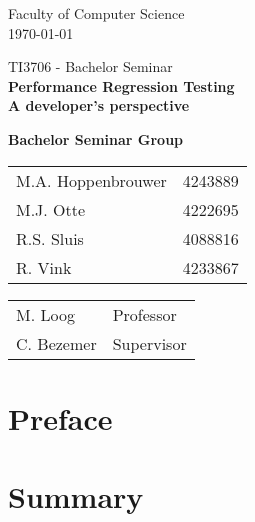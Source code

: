 \documentclass[oneside]{book}
\begin{document}
\frontmatter

\begin{titlepage}

\begin{center}
\begin{figure}[h!]
\centering
\end{figure}
Faculty of Computer Science \\
\today

\vspace{3.5cm}
\selectfont
{\Large TI3706 - Bachelor Seminar}\\
\vspace{0.0cm}
\Huge{\textbf{Performance Regression Testing\\ A developer's perspective}}
\vspace{0.5cm}
\selectfont

\vspace{5cm}
\normalsize{\textbf{Bachelor Seminar Group}}

\begin{tabular}{ l r}
\normalsize{M.A. Hoppenbrouwer} & \normalsize{4243889} \\
\normalsize{M.J. Otte} & \normalsize{4222695} \\
\normalsize{R.S. Sluis} & \normalsize{4088816} \\
\normalsize{R. Vink} & \normalsize{4233867}\\
\end{tabular}

\vspace{0.75cm}

\begin{tabular}{ l l }
\normalsize{M. Loog} & \normalsize{Professor} \\
\normalsize{C. Bezemer} & \normalsize{Supervisor} \\
\end{tabular}

\end{center}
\end{titlepage}

\chapter{Preface}
% 

\chapter{Summary}
% 
\end{document}
